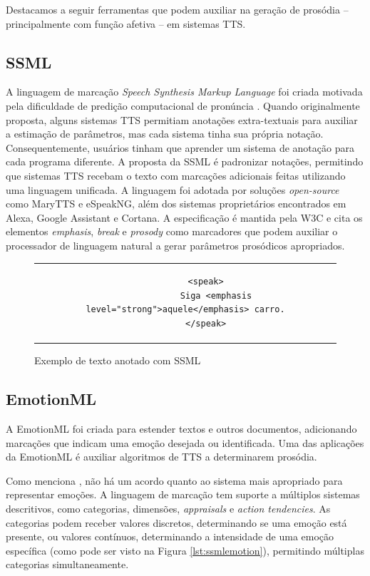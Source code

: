 Destacamos a seguir ferramentas que podem auxiliar na geração de prosódia --
principalmente com função afetiva -- em sistemas TTS.

\subsection{SSML}
A linguagem de marcação \emph{Speech Synthesis Markup Language} foi criada
motivada pela dificuldade de predição computacional de pronúncia
\cite{ssmlpaper}. Quando originalmente proposta, alguns sistemas TTS
permitiam anotações extra-textuais para auxiliar a estimação de parâmetros, mas
cada sistema tinha sua própria notação. Consequentemente, usuários tinham que
aprender um sistema de anotação para cada programa diferente. A proposta da SSML
é padronizar notações, permitindo que sistemas TTS recebam o texto com marcações
adicionais feitas utilizando uma linguagem unificada. A linguagem foi adotada
por soluções \emph{open-source} como MaryTTS e eSpeakNG, além dos sistemas
proprietários encontrados em Alexa, Google Assistant e Cortana. A especificação
é mantida pela W3C \cite{ssml} e cita os elementos \emph{emphasis}, \emph{break}
e \emph{prosody} como marcadores que podem auxiliar o processador de linguagem
natural a gerar parâmetros prosódicos apropriados.

\begin{figure}[thp]
    \centering
    \begin{tabular}{c}
        \begin{lstlisting}
        <speak>
            Siga <emphasis level="strong">aquele</emphasis> carro.
        </speak>
        \end{lstlisting}
    \end{tabular}
    \caption{Exemplo de texto anotado com SSML}
\end{figure}

\subsection{EmotionML}
A EmotionML \cite{emotionml} foi criada para estender textos e outros
documentos, adicionando marcações que indicam uma emoção desejada ou
identificada. Uma das aplicações da EmotionML é auxiliar algoritmos de TTS a
determinarem prosódia.

Como menciona , não há um acordo quanto ao sistema mais
apropriado para representar emoções. A linguagem de marcação tem suporte a
múltiplos sistemas descritivos, como categorias, dimensões, \emph{appraisals} e \emph{action tendencies}. As categorias podem receber valores discretos, determinando se uma emoção está presente, ou valores contínuos, determinando a intensidade de uma emoção específica (como
pode ser visto na Figura \ref{lst:ssmlemotion}), permitindo múltiplas categorias
simultaneamente.

